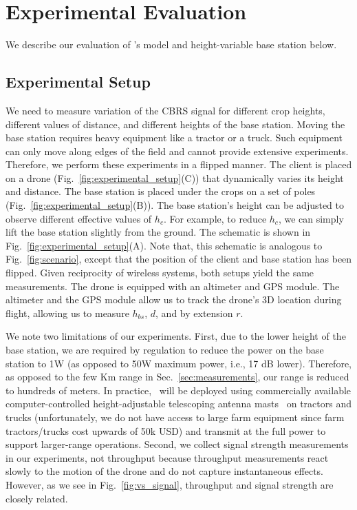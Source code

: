 \section{Experimental Evaluation}
We describe our evaluation of \name's model and height-variable base station below.

\subsection{Experimental Setup}\label{sec:eval_setup}
We need to measure variation of the CBRS signal for different crop heights, different values of distance, and different heights of the base station. Moving the base station requires heavy equipment like a tractor or a truck. Such equipment can only move along edges of the field and cannot provide extensive experiments. Therefore, we perform these experiments in a flipped manner. The client is placed on a drone (Fig.~\ref{fig:experimental_setup}(C)) that dynamically varies its height and distance. The base station is placed under the crops on a set of poles (Fig.~\ref{fig:experimental_setup}(B)). The base station's height can be adjusted to observe different effective values of $h_c$. For example, to reduce $h_c$, we can simply lift the base station slightly from the ground. The schematic is shown in Fig.~\ref{fig:experimental_setup}(A). Note that, this schematic is analogous to Fig.~\ref{fig:scenario}, except that the position of the client and base station has been flipped. Given reciprocity of wireless systems, both setups yield the same measurements. The drone is equipped with an altimeter and GPS module. The altimeter and the GPS module allow us to track the drone's 3D location during flight, allowing us to measure $h_{bs}$, $d$, and by extension $r$. 

We note two limitations of our experiments. First, due to the lower height of the base station, we are required by regulation to reduce the power on the base station to 1W (as opposed to 50W maximum power, i.e., 17 dB lower). Therefore, as opposed to the few Km range in Sec.~\ref{sec:measurements}, our range is reduced to hundreds of meters. In practice, \name\ will be deployed using commercially available computer-controlled height-adjustable telescoping antenna masts~\cite{willburt_mast_stilleto, willburt_mast_pneumatic, aluma_smarttower} on tractors and trucks (unfortunately, we do not have access to large farm equipment since farm tractors/trucks cost upwards of 50k USD) and transmit at the full power to support larger-range operations. 
Second, we collect signal strength measurements in our experiments, not throughput because throughput measurements react slowly to the motion of the drone and do not capture instantaneous effects. However, as we see in Fig.~\ref{fig:vs_signal}, throughput and signal strength are closely related.



